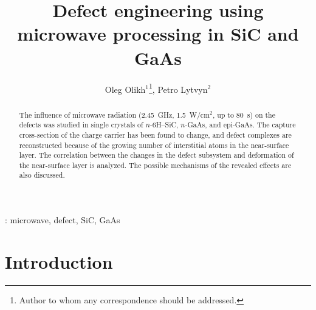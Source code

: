 \documentclass[10pt]{iopart}
\begin{document}
\title[Defect engineering using microwave processing in SiC and GaAs]{Defect engineering using microwave processing in SiC and GaAs}

\author{Oleg Olikh$^1$\footnote{Author to whom any correspondence should be addressed.}, Petro Lytvyn$^2$}

\address{$^1$Physics Faculty, Taras Shevchenko National University of Kyiv, Kyiv 01601, Ukraine}
\address{$^2$V. Lashkaryov Institute of Semiconductor Physics of NAS of Ukraine, Kyiv 03028, Ukraine}

\begin{abstract}
The influence of microwave radiation (2.45~GHz, 1.5~W/cm$^2$, up to 80~s) on the defects was studied in single crystals of $n$-6H–SiC, $n$-GaAs, and epi-GaAs.
The capture cross-section of the charge carrier has been found to change,
and defect complexes are reconstructed because of the growing number of  interstitial atoms in the near-surface layer.
The correlation between the changes in the defect subsystem and deformation of the near-surface layer is analyzed.
The possible mechanisms of the revealed effects are also discussed.
\end{abstract}

%
\vspace{2pc}
: microwave, defect, SiC, GaAs

\submitto{\SST}
%

\ioptwocol
%


\section{Introduction}\label{sec:Int}
\end{document}
